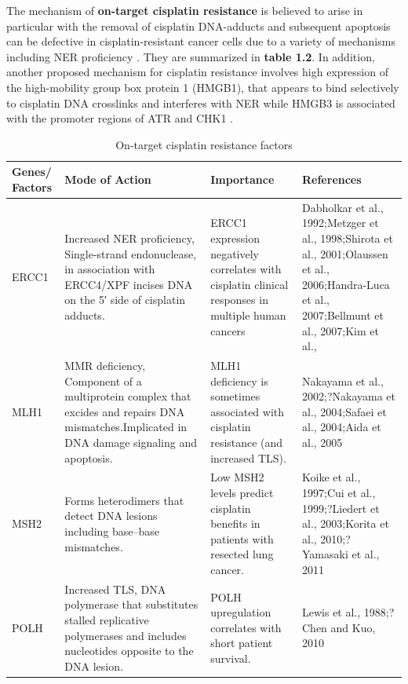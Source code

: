 The mechanism of \textbf{on-target cisplatin resistance} is believed to arise in particular with the removal of cisplatin DNA-adducts and subsequent apoptosis can be defective in cisplatin-resistant cancer cells due to a variety of mechanisms including \ac{NER} proficiency \cite{wood2000dna, shuck2008eukaryotic}. They are summarized in \textbf{table 1.2}. In addition, another proposed mechanism for cisplatin resistance involves high expression of the high-mobility group box protein 1 (HMGB1), that appears to bind selectively to cisplatin DNA crosslinks and interferes with \ac{NER} while HMGB3 is associated with the promoter regions of ATR and CHK1 \cite{awuah2017repair, mukherjee2019targeting}. 




\begin{table}[htbp]
   \centering
   \caption{On-target cisplatin resistance factors}
    \begin{tabular}{p{1.5cm}p{5cm}p{5cm}p{1cm}}
     \hline
      \textbf{Genes/ Factors} & \multicolumn{1}{l}{ \textbf{Mode of Action}} & \multicolumn{1}{p{5cm}}{ \textbf{Importance}} & \multicolumn{1}{p{5cm}}{ \textbf{References}} \\ \hline
ERCC1  & Increased NER proficiency, Single-strand endonuclease, in association with ERCC4/XPF incises DNA on the 5′ side of cisplatin adducts. & ERCC1 expression negatively correlates with  cisplatin clinical responses in multiple human cancers & \multicolumn{1}{p{5cm}}{Dabholkar et al., 1992;Metzger et al., 1998;Shirota et al., 2001;Olaussen et al., 2006;Handra-Luca et al., 2007;Bellmunt et al., 2007;Kim et al.,} \\
MLH1 & MMR deficiency, Component of a multiprotein complex that excides and repairs DNA mismatches.Implicated in DNA damage signaling and apoptosis. & MLH1 deficiency is sometimes associated with  cisplatin resistance (and increased TLS).  & \multicolumn{1}{p{5cm}}{Nakayama et al., 2002;?Nakayama et al., 2004;Safaei et al., 2004;Aida et al., 2005} \\ MSH2  & Forms heterodimers that detect DNA lesions including base–base mismatches. & Low MSH2 levels predict  cisplatin benefits in patients with resected lung cancer. & \multicolumn{1}{p{5cm}}{Koike et al., 1997;Cui et al., 1999;?Liedert et al., 2003;Korita et al., 2010;?Yamasaki et al., 2011} \\POLH & Increased TLS, DNA polymerase that substitutes stalled replicative polymerases and includes nucleotides opposite to the DNA lesion. & POLH upregulation correlates with short patient survival. & \multicolumn{1}{p{5cm}}{Lewis et al., 1988;?Chen and Kuo, 2010} \\

\end{tabular}
\end{table}
